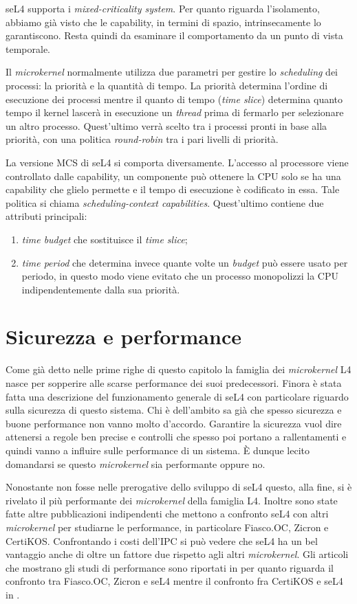 seL4 supporta i \textit{mixed-criticality system}. Per quanto riguarda l'isolamento, abbiamo già visto che le capability, in termini di spazio, intrinsecamente lo garantiscono. Resta quindi da esaminare il comportamento da un punto di vista temporale.

Il \textit{microkernel} normalmente utilizza due parametri per gestire lo \textit{scheduling} dei processi: la priorità e la quantità di tempo. La priorità determina l'ordine di esecuzione dei processi mentre il quanto di tempo (\textit{time slice}) determina quanto tempo il kernel lascerà in esecuzione un \textit{thread} prima di fermarlo per selezionare un altro processo. Quest'ultimo verrà scelto tra i processi pronti in base alla priorità, con una politica \textit{round-robin} tra i pari livelli di priorità.

La versione MCS di seL4 si comporta diversamente. L'accesso al processore viene controllato dalle capability, un componente può ottenere la CPU solo se ha una capability che glielo permette e il tempo di esecuzione è codificato in essa. Tale politica si chiama \textit{scheduling-context capabilities}. Quest'ultimo contiene due attributi principali: 
\begin{enumerate}
	\item \textit{time budget} che sostituisce il \textit{time slice};
	\item \textit{time period} che determina invece quante volte un \textit{budget} può essere usato per periodo, in questo modo viene evitato che un processo monopolizzi la CPU indipendentemente dalla sua priorità.
\end{enumerate}

\section{Sicurezza e performance}
Come già detto nelle prime righe di questo capitolo la famiglia dei \textit{microkernel} L4 nasce per sopperire alle scarse performance dei suoi predecessori. Finora è stata fatta una descrizione del funzionamento generale di seL4 con particolare riguardo sulla sicurezza di questo sistema. Chi è dell'ambito sa già che spesso sicurezza e buone performance non vanno molto d'accordo. Garantire la sicurezza vuol dire attenersi a regole ben precise e controlli che spesso poi portano a rallentamenti e quindi vanno a influire sulle performance di un sistema. È dunque lecito domandarsi se questo \textit{microkernel} sia performante oppure no.

Nonostante non fosse nelle prerogative dello sviluppo di seL4 questo, alla fine, si è rivelato il più performante dei \textit{microkernel} della famiglia L4. Inoltre sono state fatte altre pubblicazioni indipendenti che mettono a confronto seL4 con altri \textit{microkernel} per studiarne le performance, in particolare Fiasco.OC, Zicron e CertiKOS. Confrontando i costi dell'IPC si può vedere che seL4 ha un bel vantaggio anche di oltre un fattore due rispetto agli altri \textit{microkernel}.
Gli articoli che mostrano gli studi di performance sono riportati in \cite{skybridge} per quanto riguarda il confronto tra Fiasco.OC, Zicron e seL4 mentre il confronto fra CertiKOS e seL4 in \cite{CertiKOS}.